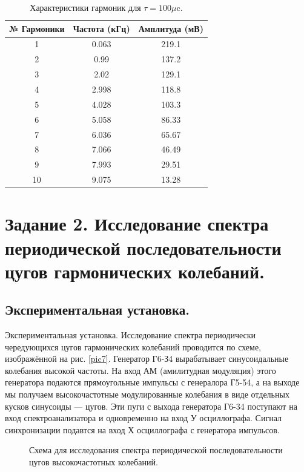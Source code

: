 \documentclass[a4paper,12pt]{article} %
\begin{document}
\begin{table}[H]
\caption{\label{tab3} Характеристики гармоник для $\tau = 100 \mu \text{c}$.}
\begin{center}
\begin{tabular}{|c|c|c|}
\hline
№ Гармоники & Частота (кГц) & Амплитуда (мВ)\\
\hline
1 & 0.063 & 219.1\\
\hline
2 & 0.99 & 137.2\\
\hline
3 & 2.02 & 129.1\\
\hline
4 & 2.998 & 118.8\\
\hline
5 & 4.028 & 103.3\\
\hline
6 & 5.058 & 86.33\\
\hline
7 & 6.036 & 65.67\\
\hline
8 & 7.066 & 46.49\\
\hline
9 & 7.993 & 29.51\\
\hline
10 & 9.075 & 13.28\\
\hline
\end{tabular}
\end{center}
\label{tab3}
\end{table}

\section{Задание 2. Исследование спектра периодической последовательности цугов гармонических колебаний.}

\subsection{Экспериментальная установка.}

Экспериментальная установка. Исследование спектра периодически чередующихся цугов гармонических колебаний проводится по схеме, изображённой на рис. \eqref{pic7}. Генератор Г6-З4 вырабатывает синусоидальные колебания высокой частоты. На вход АМ (амилитудная модуляция) этого генератора подаются прямоугольные импульсы с генералора Г5-54, а на выходе мы получаем высокочастотные модулированные колебания в виде отдельных кусков синусоиды — цугов. Эти пуги с выхода генератора Г6-34 поступают на вход спектроанализатора и одновременно на вход У осциллографа. Сигнал синхронизации подавтся на вход Х осциллографа с генератора импульсов.

\begin{figure}[H]\label{pic7}
 	\caption{Схема для исследования спектра периодической последовательности цугов высокочастотных колебаний.}
\end{figure}
\end{document}
